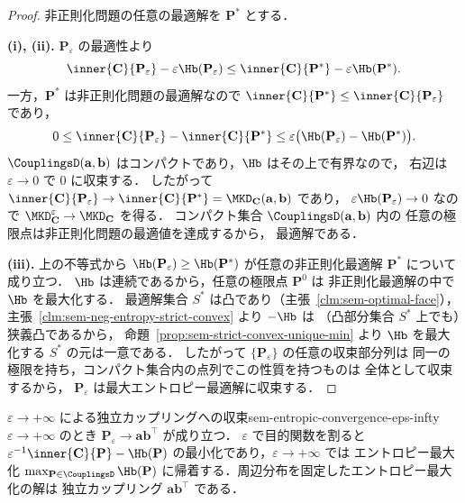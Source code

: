 \begin{proof}
  非正則化問題の任意の最適解を $\mathbf{P}^*$ とする．

  \textbf{(i), (ii).}
  $\mathbf{P}_\varepsilon$ の最適性より
  \[
    \inner{\mathbf{C}}{\mathbf{P}_\varepsilon}
    - \varepsilon\Hb(\mathbf{P}_\varepsilon)
    \leq
    \inner{\mathbf{C}}{\mathbf{P}^*}
    - \varepsilon\Hb(\mathbf{P}^*).
  \]
  一方，$\mathbf{P}^*$ は非正則化問題の最適解なので
  $\inner{\mathbf{C}}{\mathbf{P}^*}
  \leq \inner{\mathbf{C}}{\mathbf{P}_\varepsilon}$ であり，
  \[
    0
    \leq
    \inner{\mathbf{C}}{\mathbf{P}_\varepsilon}
    - \inner{\mathbf{C}}{\mathbf{P}^*}
    \leq
    \varepsilon\bigl(\Hb(\mathbf{P}_\varepsilon)-\Hb(\mathbf{P}^*)\bigr).
  \]
  $\CouplingsD(\mathbf{a}, \mathbf{b})$ はコンパクトであり，$\Hb$ はその上で有界なので，
  右辺は $\varepsilon \to 0$ で $0$ に収束する．
  したがって
  $\inner{\mathbf{C}}{\mathbf{P}_\varepsilon}
  \to \inner{\mathbf{C}}{\mathbf{P}^*}
  = \MKD_{\mathbf{C}}(\mathbf{a},\mathbf{b})$ であり，
  $\varepsilon\Hb(\mathbf{P}_\varepsilon) \to 0$ なので
  $\MKD_{\mathbf{C}}^\varepsilon \to \MKD_{\mathbf{C}}$ を得る．
  コンパクト集合 $\CouplingsD(\mathbf{a},\mathbf{b})$ 内の
  任意の極限点は非正則化問題の最適値を達成するから，
  最適解である．

  \textbf{(iii).}
  上の不等式から
  $\Hb(\mathbf{P}_\varepsilon) \geq \Hb(\mathbf{P}^*)$
  が任意の非正則化最適解 $\mathbf{P}^*$ について成り立つ．
  $\Hb$ は連続であるから，任意の極限点 $\mathbf{P}^0$ は
  非正則化最適解の中で $\Hb$ を最大化する．
  最適解集合 $S^*$ は凸であり（主張~\ref{clm:sem-optimal-face}），
  主張~\ref{clm:sem-neg-entropy-strict-convex} より $-\Hb$ は
  （凸部分集合 $S^*$ 上でも）狭義凸であるから，
  命題~\ref{prop:sem-strict-convex-unique-min} より
  $\Hb$ を最大化する $S^*$ の元は一意である．
  したがって $\{\mathbf{P}_\varepsilon\}$ の任意の収束部分列は
  同一の極限を持ち，コンパクト集合内の点列でこの性質を持つものは
  全体として収束するから，
  $\mathbf{P}_\varepsilon$ は最大エントロピー最適解に収束する．
\end{proof}

\begin{remark}{$\varepsilon \to +\infty$ による独立カップリングへの収束}{sem-entropic-convergence-eps-infty}
  $\varepsilon \to +\infty$ のとき
  $\mathbf{P}_\varepsilon \to \mathbf{a}\mathbf{b}^\top$ が成り立つ．
  $\varepsilon$ で目的関数を割ると
  $\varepsilon^{-1}\inner{\mathbf{C}}{\mathbf{P}} - \Hb(\mathbf{P})$
  の最小化であり，$\varepsilon \to +\infty$ では
  エントロピー最大化
  $\max_{\mathbf{P} \in \CouplingsD} \Hb(\mathbf{P})$
  に帰着する．周辺分布を固定したエントロピー最大化の解は
  独立カップリング $\mathbf{a}\mathbf{b}^\top$ である．
\end{remark}
